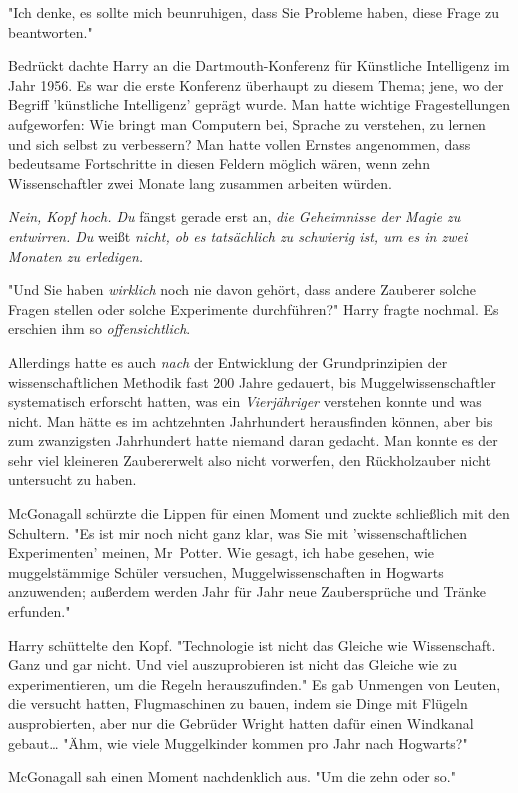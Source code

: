 {"Ich denke, es sollte mich beunruhigen, dass Sie Probleme haben, diese Frage zu beantworten."

Bedrückt dachte Harry an die Dartmouth-Konferenz für Künstliche Intelligenz im Jahr 1956. Es war die erste Konferenz überhaupt zu diesem Thema; jene, wo der Begriff 'künstliche Intelligenz' geprägt wurde. Man hatte wichtige Fragestellungen aufgeworfen: Wie bringt man Computern bei, Sprache zu verstehen, zu lernen und sich selbst zu verbessern? Man hatte vollen Ernstes angenommen, dass bedeutsame Fortschritte in diesen Feldern möglich wären, wenn zehn Wissenschaftler zwei Monate lang zusammen arbeiten würden.

\emph{Nein, Kopf hoch. Du} fängst gerade erst an, \emph{die Geheimnisse der Magie zu entwirren. Du} weißt \emph{nicht, ob es tatsächlich zu schwierig ist, um es in zwei Monaten zu erledigen.}

"Und Sie haben \emph{wirklich} noch nie davon gehört, dass andere Zauberer solche Fragen stellen oder solche Experimente durchführen?" Harry fragte nochmal. Es erschien ihm so \emph{offensichtlich}.

Allerdings hatte es auch \emph{nach} der Entwicklung der Grundprinzipien der wissenschaftlichen Methodik fast 200 Jahre gedauert, bis Muggelwissenschaftler systematisch erforscht hatten, was ein \emph{Vierjähriger} verstehen konnte und was nicht. Man hätte es im achtzehnten Jahrhundert herausfinden können, aber bis zum zwanzigsten Jahrhundert hatte niemand daran gedacht. Man konnte es der sehr viel kleineren Zaubererwelt also nicht vorwerfen, den Rückholzauber nicht untersucht zu haben.

McGonagall schürzte die Lippen für einen Moment und zuckte schließlich mit den Schultern. "Es ist mir noch nicht ganz klar, was Sie mit 'wissenschaftlichen Experimenten' meinen, Mr~Potter. Wie gesagt, ich habe gesehen, wie muggelstämmige Schüler versuchen, Muggelwissenschaften in Hogwarts anzuwenden; außerdem werden Jahr für Jahr neue Zaubersprüche und Tränke erfunden."

Harry schüttelte den Kopf. "Technologie ist nicht das Gleiche wie Wissenschaft. Ganz und gar nicht. Und viel auszuprobieren ist nicht das Gleiche wie zu experimentieren, um die Regeln herauszufinden." Es gab Unmengen von Leuten, die versucht hatten, Flugmaschinen zu bauen, indem sie Dinge mit Flügeln ausprobierten, aber nur die Gebrüder Wright hatten dafür einen Windkanal gebaut… "Ähm, wie viele Muggelkinder kommen pro Jahr nach Hogwarts?"

McGonagall sah einen Moment nachdenklich aus. "Um die zehn oder so."

}
